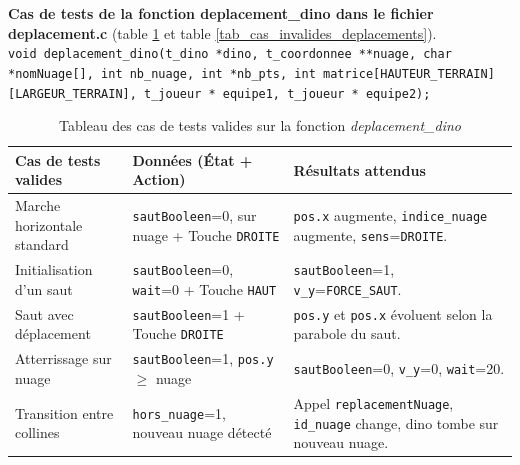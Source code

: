 \documentclass[11pt,a4paper]{article}
\begin{document}
\newpage
\textbf{Cas de tests de la fonction deplacement\_dino dans le fichier deplacement.c}
(table \ref{tab_cas_valides_deplacements} et table \ref{tab_cas_invalides_deplacements}).\\
\texttt{void deplacement\_dino(t\_dino *dino, t\_coordonnee **nuage, char *nomNuage[], int nb\_nuage, int *nb\_pts, int matrice[HAUTEUR\_TERRAIN][LARGEUR\_TERRAIN], t\_joueur * equipe1, t\_joueur * equipe2);}
\begin{table}[ht]
    \small
    \centering
    \begin{tabularx}{\textwidth}{|
    >{\centering\arraybackslash}p{3.2cm}|
    >{\centering\arraybackslash}p{4cm}|
    >{\centering\arraybackslash}X|} \hline
        \textbf{Cas de tests valides} & \textbf{Données (État + Action)} & \textbf{Résultats attendus} \\ \hline
        Marche horizontale standard & \texttt{sautBooleen}=0, sur nuage + Touche \texttt{DROITE} & \texttt{pos.x} augmente, \texttt{indice\_nuage} augmente, \texttt{sens}=\texttt{DROITE}. \\ \hline
        Initialisation d'un saut & \texttt{sautBooleen}=0, \texttt{wait}=0 + Touche \texttt{HAUT} & \texttt{sautBooleen}=1, \texttt{v\_y}=\texttt{FORCE\_SAUT}. \\ \hline
        Saut avec déplacement & \texttt{sautBooleen}=1 + Touche \texttt{DROITE} & \texttt{pos.y} et \texttt{pos.x} évoluent selon la parabole du saut. \\ \hline
        Atterrissage sur nuage & \texttt{sautBooleen}=1, \texttt{pos.y} $\ge$ nuage & \texttt{sautBooleen}=0, \texttt{v\_y}=0, \texttt{wait}=20. \\ \hline
        Transition entre collines & \texttt{hors\_nuage}=1, nouveau nuage détecté & Appel \texttt{replacementNuage}, \texttt{id\_nuage} change, dino tombe sur nouveau nuage. \\ \hline
    \end{tabularx}
    \caption{Tableau des cas de tests valides sur la fonction \textit{deplacement\_dino}}
    \label{tab_cas_valides_deplacements}
\end{table}
\end{document}
